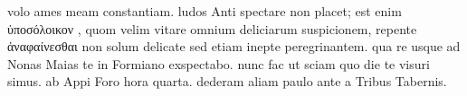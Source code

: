 


 volo ames meam constantiam. ludos Anti spectare non placet; est enim ὑποσόλοικον , quom velim vitare omnium deliciarum suspicionem, repente ἀναφαίνεσθαι non solum delicate sed etiam inepte peregrinantem. qua re usque ad Nonas Maias te in Formiano exspectabo. nunc fac ut sciam quo die te visuri simus. ab Appi Foro hora quarta. dederam aliam paulo ante a Tribus Tabernis.
